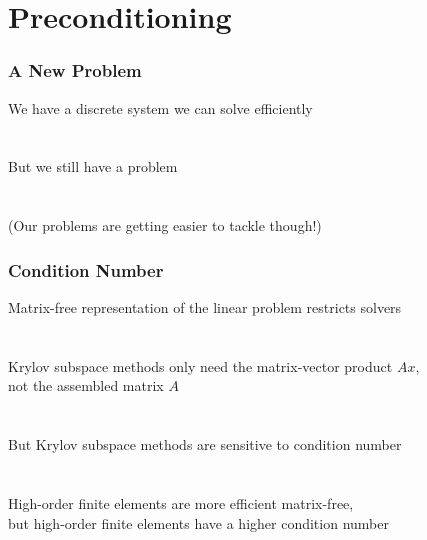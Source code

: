 \documentclass{beamer}
\begin{document}
\section{Preconditioning}

\begin{frame}
\begin{center}
\frametitle{A New Problem}

We have a discrete system we can solve efficiently\\

~\\

~\\

But we still have a problem\\

~\\

~\\

(Our problems are getting easier to tackle though!)

\end{center}
\end{frame}


\begin{frame}
\begin{center}
\frametitle{Condition Number}

Matrix-free representation of the linear problem restricts solvers\\

~\\

~\\

Krylov subspace methods only need the matrix-vector product $A x$,\\
not the assembled matrix $A$\\

~\\

~\\

But Krylov subspace methods are sensitive to condition number\\

~\\

~\\

High-order finite elements are more efficient matrix-free,\\
but high-order finite elements have a higher condition number

\end{center}
\end{frame}
\end{document}
